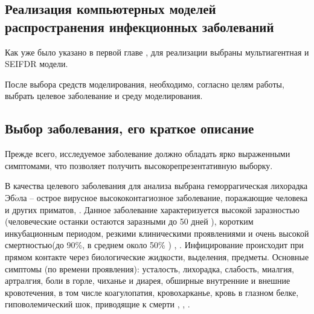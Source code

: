 \newpage
\parindent=1cm %
\begin{center}
		
		\section{Реализация компьютерных моделей распространения инфекционных заболеваний}
		
\end{center}

Как уже было указано  в первой главе , для реализации выбраны мультиагентная и SEIFDR модели.

После выбора средств моделирования, необходимо, согласно целям работы, выбрать целевое заболевание и среду моделирования.


\subsection{Выбор заболевания, его краткое описание}
Прежде всего, исследуемое заболевание должно обладать ярко выраженными симптомами, что позволяет получить высокорепрезентативную  выборку.


В качества целевого заболевания для анализа выбрана геморрагическая лихорадка Эб$\acute{o}$ла -- острое вирусное высококонтагиозное заболевание, поражающие человека и других приматов, . Данное заболевание характеризуется высокой заразностью (человеческие останки остаются заразными до 50 дней 
\cite{CDC:2014:1}), коротким инкубационным периодом, резкими клиническими проявлениями и очень высокой смертностью(до 90\%, в среднем около 50\% ) \cite{WHO:2018:1}, \cite[с. 444]{Sunit:2014}. %
Инфицирование происходит при прямом контакте через биологические жидкости, выделения, предметы. Основные симптомы (по времени проявления):  усталость, лихорадка, слабость, миалгия,  артралгия, боли в горле, чиханье и диарея,  обширные внутренние и внешние кровотечения, в том числе коагулопатия, кровохарканье, кровь в глазном белке, гиповолемический шок, приводящие к смерти \cite{ncbi:2011}, \cite{ovid:2016}, \cite{Springer:2015}  . 

